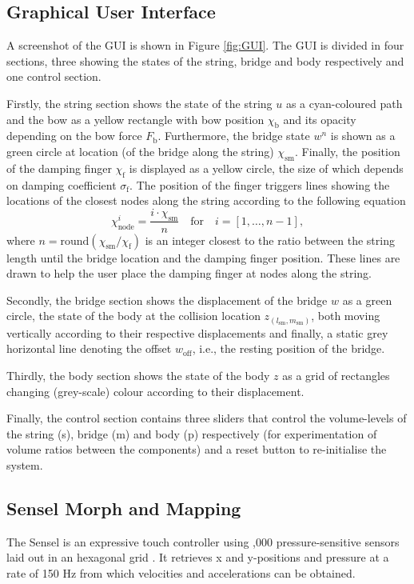 \documentclass[dvipsnames, pdftex]{article}
\def\stringx{\chi}
\def\us{u}
\def\um{w}
\def\up{z}
\begin{document}
\subsection{Graphical User Interface}\label{sec:GUI}
A screenshot of the GUI is shown in Figure \ref{fig:GUI}. The GUI is divided in four sections, three showing the states of the string, bridge and body respectively and one control section. 

Firstly, the string section shows the state of the string $\us$ as a cyan-coloured path and the bow as a yellow rectangle with bow position $\stringx_\text{b}$ and its opacity depending on the bow force $F_\text{b}$. Furthermore, the bridge state $\um^n$ is shown as a green circle at location (of the bridge along the string) $\stringx_\text{sm}$. Finally, the position of the damping finger $\stringx_\text{f}$ is displayed as a yellow circle, the size of which depends on damping coefficient $\sigma_\text{f}$. The position of the finger triggers lines showing the locations of the closest nodes along the string according to the following equation
\begin{equation}\label{eq:node}
    \stringx_\text{node}^i = \frac{i\cdot \stringx_\text{sm}}{n}\quad \text{for} \quad i = [1,\hdots,n-1],
\end{equation}
where $n = \text{round} (\stringx_\text{sm}/\stringx_\text{f})$ is an integer closest to the ratio between the string length until the bridge location and the damping finger position. These lines are drawn to help the user place the damping finger at nodes along the string.

Secondly, the bridge section shows the displacement of the bridge $\um$ as a green circle, the state of the body at the collision location $\up_{(l_\text{sm},m_\text{sm})}$, both moving vertically according to their respective displacements and finally, a static grey horizontal line denoting the offset $\um_\text{off}$, i.e., the resting position of the bridge.

Thirdly, the body section shows the state of the body $\up$ as a grid of rectangles changing (grey-scale) colour according to their displacement.

Finally, the control section contains three sliders that control the volume-levels of the string (s), bridge (m) and body (p) respectively (for experimentation of volume ratios between the components) and a reset button to re-initialise the system. 

\subsection{Sensel Morph and Mapping}
The Sensel is an expressive touch controller using ,000 pressure-sensitive sensors laid out in an hexagonal grid \cite{sensel2020}. It retrieves x and y-positions and pressure at a rate of 150 Hz from which velocities and accelerations can be obtained.
\end{document}
